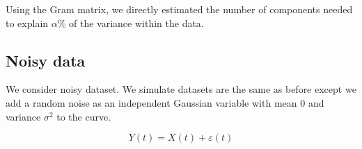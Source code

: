 Using the Gram matrix, we directly estimated the number of components needed to explain $\alpha\%$ of the variance within the data.


\subsection{Noisy data} %
\label{sub:noisy_data}

We consider noisy dataset. We simulate datasets are the same as before except we add a random noise as an independent Gaussian variable with mean $0$ and variance $\sigma^2$ to the curve.

\begin{equation}\label{eq:noisy_curves}
    Y(t) = X(t) + \varepsilon(t)
\end{equation}


